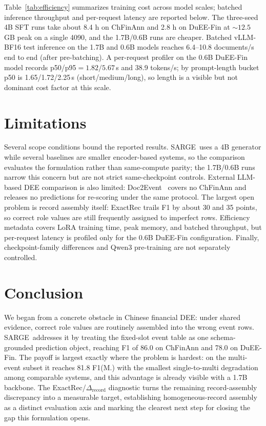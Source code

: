 \documentclass[runningheads]{llncs}
\newcommand{\method}{SARGE}
\begin{document}
Table~\ref{tab:efficiency} summarizes training cost across model scales; batched inference throughput and per-request latency are reported below. The three-seed 4B SFT runs take about 8.4 h on ChFinAnn and 2.8 h on DuEE-Fin at ${\sim}12.5$\,GB peak on a single 4090, and the 1.7B/0.6B runs are cheaper. Batched vLLM-BF16 test inference on the 1.7B and 0.6B models reaches 6.4--10.8 documents/s end to end (after pre-batching). A per-request profiler on the 0.6B DuEE-Fin model records p50/p95${=}1.82/5.67$\,s and 38.9 tokens/s; by prompt-length bucket p50 is 1.65/1.72/2.25\,s (short/medium/long), so length is a visible but not dominant cost factor at this scale.

\section{Limitations}
\label{sec:limitations}

Several scope conditions bound the reported results. \method\ uses a 4B generator while several baselines are smaller encoder-based systems, so the comparison evaluates the formulation rather than same-compute parity; the 1.7B/0.6B runs narrow this concern but are not strict same-checkpoint controls. External LLM-based DEE comparison is also limited: Doc2Event~\cite{ding2025doc2event} covers no ChFinAnn and releases no predictions for re-scoring under the same protocol. The largest open problem is record assembly itself: ExactRec trails F1 by about 30 and 35 points, so correct role values are still frequently assigned to imperfect rows. Efficiency metadata covers LoRA training time, peak memory, and batched throughput, but per-request latency is profiled only for the 0.6B DuEE-Fin configuration. Finally, checkpoint-family differences and Qwen3 pre-training are not separately controlled.

\section{Conclusion}
\label{sec:conclusion}

We began from a concrete obstacle in Chinese financial DEE: under shared evidence, correct role values are routinely assembled into the wrong event rows. \method\ addresses it by treating the fixed-slot event table as one schema-grounded prediction object, reaching F1 of 86.0 on ChFinAnn and 78.0 on DuEE-Fin. The payoff is largest exactly where the problem is hardest: on the multi-event subset it reaches 81.8 F1(M.) with the smallest single-to-multi degradation among comparable systems, and this advantage is already visible with a 1.7B backbone. The ExactRec/$\Delta_{\mathrm{record}}$ diagnostic turns the remaining record-assembly discrepancy into a measurable target, establishing homogeneous-record assembly as a distinct evaluation axis and marking the clearest next step for closing the gap this formulation opens.
\end{document}
